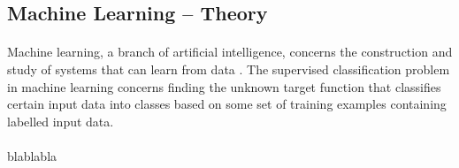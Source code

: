 \subsection{Machine Learning -- Theory}

\paragraph{}
	Machine learning, a branch of artificial intelligence, concerns the construction and study of systems that can learn from data \cite{wiki:machineLearning}. The supervised classification problem in machine learning concerns finding the unknown target function that classifies certain input data into classes based on some set of training examples containing labelled input data.
	
\paragraph{}
	blablabla




